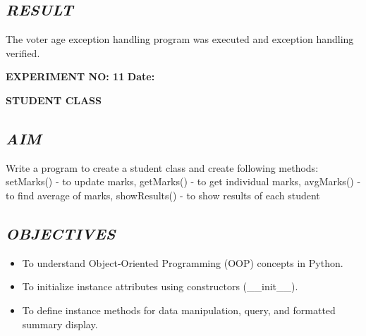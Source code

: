 \documentclass[11pt,a4paper]{article}
\begin{document}
\subsection*{\textit{RESULT}}
The voter age exception handling program was executed and exception handling verified.

\newpage

\noindent
\textbf{\large EXPERIMENT NO: 11} \hfill \textbf{\large Date: \underline{\hspace{3cm}}}

\vspace{0.2cm}
\begin{center}
{\Huge \textbf{\textcolor{navyblue}{STUDENT CLASS}}}
\end{center}
\vspace{0.3cm}

\subsection*{\textit{AIM}}
Write a program to create a student class and create following methods: setMarks() - to update marks, getMarks() - to get individual marks, avgMarks() - to find average of marks, showResults() - to show results of each student

\subsection*{\textit{OBJECTIVES}}
\begin{itemize}
  \item To understand Object-Oriented Programming (OOP) concepts in Python.
  \item To initialize instance attributes using constructors (__init__).
  \item To define instance methods for data manipulation, query, and formatted summary display.
\end{itemize}
\end{document}
